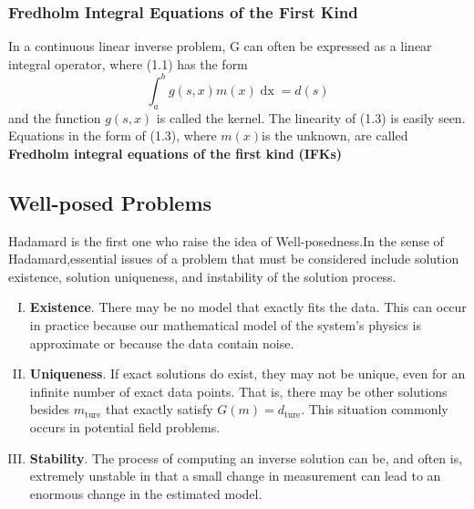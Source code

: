 \documentclass[a4paper]{article}
\newcommand{\tmop}[1]{\ensuremath{\operatorname{#1}}}
\newcommand{\tmstrong}[1]{\textbf{#1}}
\newenvironment{enumerateromancap}{\begin{enumerate}[I.] }{\end{enumerate}}
\begin{document}
\subsubsection{Fredholm Integral Equations of the First Kind}

In a continuous linear inverse problem, G can often be expressed as a linear
integral operator, where (1.1) has the form
\begin{equation}
  \int_a^b g (s, x) m (x) \tmop{dx} = d (s)
\end{equation}
and the function $g (s, x)$ is called the kernel. The linearity of (1.3) is
easily seen. Equations in the form of (1.3), where $m(x)$is the unknown, are
called {\tmstrong{Fredholm integral equations of the first kind}}
{\tmstrong{(IFKs)}}


\subsection{Well-posed Problems}

Hadamard is the first one who raise the idea of Well-posedness.In the sense of
Hadamard,essential issues of a problem that must be considered include
solution existence, solution uniqueness, and instability of the solution
process{\cite{2}}.
\begin{enumerateromancap}
  \item {\tmstrong{Existence}}. There may be no model that exactly fits the
  data. This can occur in practice because our mathematical model of the
  system's physics is approximate or because the data contain noise.

  \item {\tmstrong{Uniqueness}}. If exact solutions do exist, they may not be
  unique, even for an infinite number of exact data points. That is, there may
  be other solutions besides $m_{\tmop{ture}}$ that exactly satisfy $G (m) =
  d_{\tmop{ture}}$. This situation commonly occurs in potential field
  problems.

  \item {\tmstrong{Stability}}. The process of computing an inverse solution
  can be, and often is, extremely unstable in that a small change in
  measurement can lead to an enormous change in the estimated model.
\end{enumerateromancap}
\end{document}

